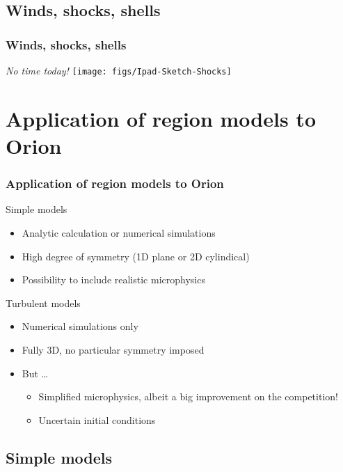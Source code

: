 \documentclass[presentation]{beamer}
\begin{document}
\subsection{Winds, shocks, shells}
\begin{frame}
  \frametitle{Winds, shocks, shells}
  \begin{block}{\emph{No time today!} }
    \texttt{[image: figs/Ipad-Sketch-Shocks]}
  \end{block}
\end{frame}

\section{Application of \hii{} region models to Orion}

\begin{frame}
  \frametitle{Application of \hii{} region models to Orion}
  \begin{block}{Simple models}
    \begin{itemize}
    \item \alert{Analytic calculation} or numerical simulations
    \item High degree of symmetry (1D plane or \alert{2D cylindical})
    \item Possibility to include realistic microphysics
    \end{itemize}
  \end{block}

  \begin{block}{Turbulent models}
    \begin{itemize}
    \item Numerical simulations only
    \item Fully 3D, no particular symmetry imposed
    \item \alert{But \dots}
      \begin{itemize}
      \item Simplified microphysics, {\scriptsize albeit a big
          improvement on the competition!}
      \item Uncertain initial conditions
      \end{itemize}
    \end{itemize}
  \end{block}

\end{frame}


\subsection{Simple models}
\end{document}
